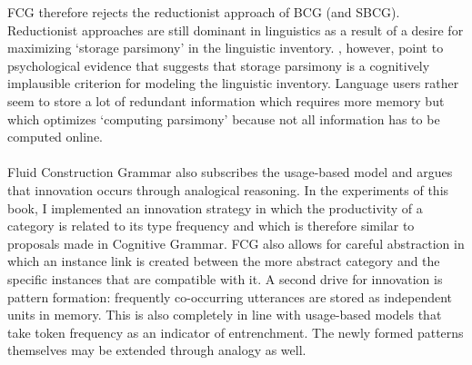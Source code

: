 FCG therefore rejects the reductionist approach of BCG (and SBCG). Reductionist approaches are still dominant in linguistics as a result of a desire for maximizing `storage parsimony' in the linguistic inventory. \citet[p. 278]{croft04cognitive}, however, point to psychological evidence that suggests that storage parsimony is a cognitively implausible criterion for modeling the linguistic inventory. Language users rather seem to store a lot of redundant information which requires more memory but which optimizes  `computing parsimony' because not all information has to be computed online.
\\
\\
 Fluid Construction Grammar also subscribes the usage-based model and argues that innovation occurs through analogical reasoning. In the experiments of this book, I implemented an innovation strategy in which the productivity of a category is related to its type frequency and which is therefore similar to proposals made in Cognitive Grammar. FCG also allows for careful abstraction in which an instance link is created between the more abstract category and the specific instances that are compatible with it. A second drive for innovation is pattern formation: frequently co-occurring utterances are stored as independent units in memory. This is also completely in line with usage-based models that take token frequency as an indicator of entrenchment. The newly formed patterns themselves may be extended through analogy as well.


